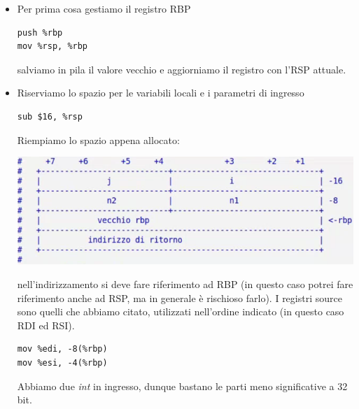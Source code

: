 \documentclass[11pt]{report}
\theoremstyle{definition}
\begin{document}
\begin{itemize}
\item Per prima cosa gestiamo il registro RBP 
\begin{verbatim}
push %rbp
mov %rsp, %rbp
\end{verbatim}
salviamo in pila il valore vecchio e aggiorniamo il registro con l'RSP attuale.
\item Riserviamo lo spazio per le variabili locali e i parametri di ingresso
\begin{verbatim}
sub $16, %rsp
\end{verbatim}
Riempiamo lo spazio appena allocato:
\begin{center}
\includegraphics[scale=.85]{img/33.PNG}
\end{center} 
nell'indirizzamento si deve fare riferimento ad RBP (in questo caso potrei fare riferimento anche ad RSP, ma in generale è rischioso farlo). I registri source sono quelli che abbiamo citato, utilizzati nell'ordine indicato (in questo caso RDI ed RSI). 
\begin{verbatim}
mov %edi, -8(%rbp)
mov %esi, -4(%rbp)
\end{verbatim}
Abbiamo due \emph{int} in ingresso, dunque bastano le parti meno significative a 32 bit.
\end{itemize}
\end{document}
